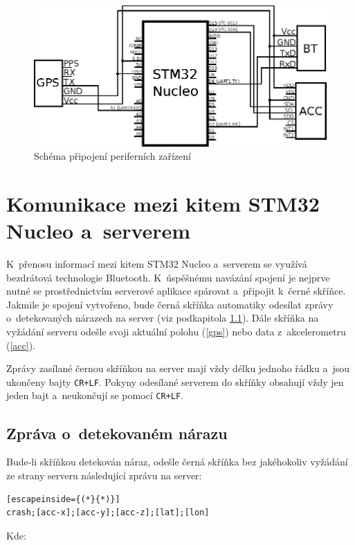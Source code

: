\documentclass[a4paper,11pt,titlepage]{article}
\begin{document}
\begin{figure}[h]
\centering
\includegraphics[scale=1.1]{img/schema.eps}
\caption{Schéma připojení periferních zařízení}\end{figure}



\section{Komunikace mezi kitem STM32 Nucleo a~serverem}
\label{msgs}
K~přenosu informací mezi kitem STM32 Nucleo a~serverem se využívá bezdrátová technologie
Bluetooth. K~úspěšnému navázání spojení je nejprve nutné se prostřednictvím serverové aplikace
spárovat a~připojit k~černé skříňce. Jakmile je spojení vytvořeno, bude černá skříňka automatiky
odesílat zprávy o~detekovaných nárazech na server (viz podkapitola \ref{crash}).
Dále skříňka na vyžádání serveru odešle svoji aktuální polohu (\ref{gps}) nebo
data z~akcelerometru (\ref{acc}).

Zprávy zasílané černou skříňkou na server mají vždy délku jednoho řádku a~jsou ukončeny
bajty \texttt{CR+LF}.
Pokyny odesílané serverem do skříňky obsahují vždy jen jeden bajt a~neukončují se pomocí \texttt{CR+LF}.

\newpage
\subsection{Zpráva o~detekovaném nárazu}
\label{crash}
Bude-li skříňkou detekován náraz, odešle černá skříňka bez jakéhokoliv vyžádání
ze strany serveru následující zprávu na server:

\begin{lstlisting}[escapeinside={(*}{*)}]
crash;[acc-x];[acc-y];[acc-z];[lat];[lon]
\end{lstlisting}

Kde:
\end{document}

